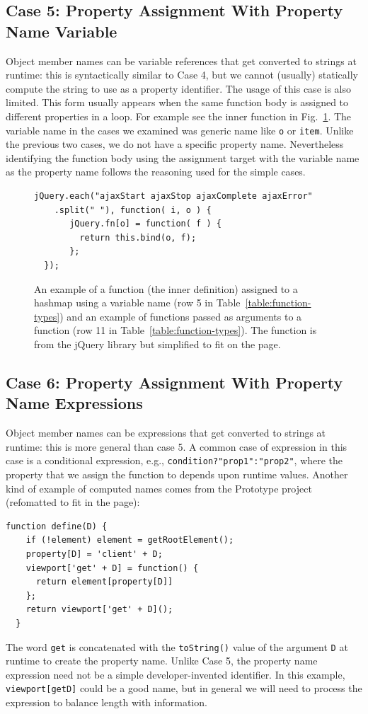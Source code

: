 \documentclass[10pt, preprint]{sigplanconf}
\begin{document}
\subsection{Case 5: Property Assignment With  Property Name Variable}
Object member names can be variable references that get converted to strings at runtime: this is syntactically similar to Case 4, but we cannot (usually) statically compute the string to use as a property identifier.
The usage of this case is also limited. This form usually appears when the same function body is assigned to different properties in a loop. 
For example see the inner function in Fig.~\ref{fig:jQueryEach}. The variable
 name in the cases we examined was generic name like \verb|o| or \verb|item|. Unlike the previous two cases, we
do not have a specific property name.  Nevertheless identifying the function body using the assignment target with the variable name as the property name follows the reasoning used for the simple cases.
\begin{figure}[htp]
\lstset{basicstyle=\scriptsize}
\begin{lstlisting}[frame=single, language=myLang]
  jQuery.each("ajaxStart ajaxStop ajaxComplete ajaxError"
    .split(" "), function( i, o ) {
       jQuery.fn[o] = function( f ) {
         return this.bind(o, f);
       };
  });
\end{lstlisting}
\caption{An example of a function (the inner definition) assigned to a hashmap using a variable name (row 5 in Table~\ref{table:function-types}) and an example of 
functions passed as arguments to a function (row 11 in Table~\ref{table:function-types}). The function is from the jQuery library but simplified to fit on the page. }
\label{fig:jQueryEach}
\end{figure}

\subsection{Case 6:  Property Assignment With  Property Name Expressions}
\label{sec:propexpressions}
Object member names can be expressions that get converted to strings at runtime: this is more general than case 5. 
 A common case of expression in this case is a conditional expression, e.g., \verb|condition?"prop1":"prop2"|, where the property that we assign the function to depends upon runtime values. Another kind of example of computed names comes from the Prototype project (refomatted to fit in the page):
\lstset{basicstyle=\scriptsize}
\begin{lstlisting}[frame=single, language=myLang]
  function define(D) {
    if (!element) element = getRootElement();
    property[D] = 'client' + D;
    viewport['get' + D] = function() { 
      return element[property[D]] 
    };
    return viewport['get' + D]();
  }
\end{lstlisting}
The word \verb|get| is concatenated with the \verb|toString()| value of the argument \verb|D| at runtime to create the property name.  Unlike Case 5, the property name expression need not be a simple developer-invented identifier. In this example, \verb|viewport[getD]| could be a good name, but in general we will need to process the expression to balance length with information.
\end{document}
